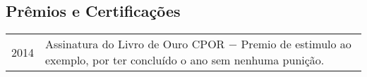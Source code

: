 \documentclass[a4paper, oneside, final]{scrartcl}
\begin{document}
\begin{center}
\section{Prêmios e Certificações}

\begin{tabularx}{0.97\linewidth}{p{2cm}X}
2014        & Assinatura do Livro de Ouro CPOR $-$ Premio de estimulo ao exemplo, por ter concluído o ano sem nenhuma punição.
\end{tabularx}



\end{center}
\end{document}

